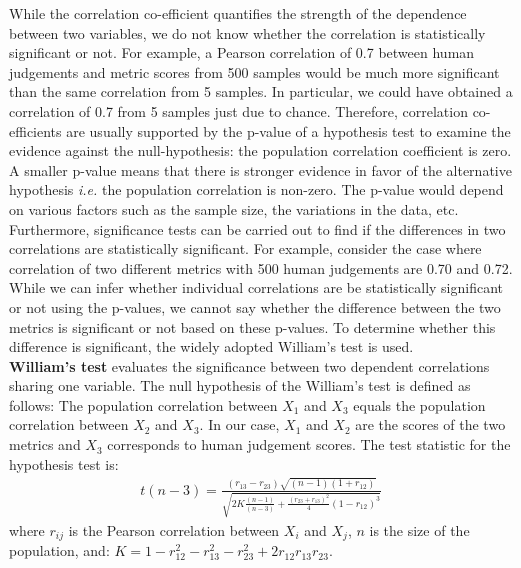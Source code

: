 While the correlation co-efficient quantifies the strength of the dependence between two variables, we do not know whether the correlation is statistically significant or not. For example, a Pearson correlation of 0.7 between human judgements and metric scores from 500 samples would be much more significant than the same correlation from 5 samples. In particular, we could have obtained a correlation of 0.7 from 5 samples just due to chance. Therefore, correlation co-efficients are usually supported by the p-value of a hypothesis test to examine the evidence against the null-hypothesis: the population correlation coefficient is zero. A smaller p-value means that there is stronger evidence in favor of the alternative hypothesis \textit{i.e.} the population correlation is non-zero. The p-value would depend on various factors such as the sample size, the variations in the data, etc. \\
Furthermore, significance tests can be carried out to find 
if the differences in two correlations are statistically significant. For example, consider the case where correlation of two different metrics with 500 human judgements are 0.70 and 0.72. While we can infer whether individual correlations are be statistically significant or not using the p-values, we cannot say whether the difference between the two metrics is significant or not based on these p-values. To determine whether this difference is significant, the widely adopted William's test is used. \\
\noindent \textbf{William's test}  evaluates the significance between two dependent correlations sharing one variable. The null hypothesis of the William's test is defined as follows: The population correlation between $X_1$ and $X_3$ equals the population correlation between $X_2$ and $X_3$. In our case, $X_1$ and $X_2$ are the scores of the two metrics and $X_3$ corresponds to human judgement scores. The test statistic for the hypothesis test is:
\begin{align*}
    t(n-3) = \frac{(r_{13}-r_{23}) \sqrt{(n-1)(1+r_{12})}}{\sqrt{2K\frac{(n-1)}{(n-3)} + \frac{{(r_{23}+r_{13})}^{2}}{4} {(1-r_{12})}^3 }}
\end{align*}
where $r_{ij}$ is the Pearson correlation between $X_i$
and $X_j$, $n$ is the size of the population, and: $K = 1 - r_{12}^2 - r_{13}^2 - r_{23}^2 + 2r_{12}r_{13}r_{23}$.

